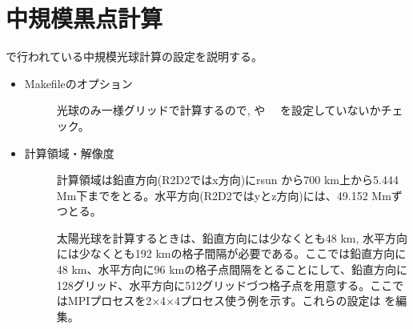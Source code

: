 \documentclass[letterpaper,10pt,dvipdfmx,report]{sphinxmanual}
\begin{document}
\section{中規模黒点計算}
\label{\detokenize{typical_case:id5}}
 で行われている中規模光球計算の設定を説明する。
\begin{itemize}
\item {} \begin{description}
\item[{Makefileのオプション}] \leavevmode
光球のみ一様グリッドで計算するので,  や　 を設定していないかチェック。

\end{description}

\item {} \begin{description}
\item[{計算領域・解像度}] \leavevmode
計算領域は鉛直方向(R2D2ではx方向)にrsun から700 km上から5.444 Mm下までをとる。水平方向(R2D2ではyとz方向)には、49.152 Mmずつとる。

太陽光球を計算するときは、鉛直方向には少なくとも48 km, 水平方向には少なくとも192 kmの格子間隔が必要である。ここでは鉛直方向に48 km、水平方向に96 kmの格子点間隔をとることにして、鉛直方向に128グリッド、水平方向に512グリッドづつ格子点を用意する。ここではMPIプロセスを2×4×4プロセス使う例を示す。これらの設定は  を編集。

\begin{sphinxVerbatim}[commandchars=\\\{\}]
      
      
           
           


\end{sphinxVerbatim}
\end{description}
\end{itemize}
\end{document}
